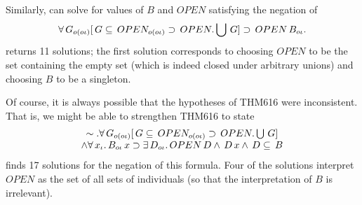 Similarly,  can solve for values of $B$ and $OPEN$
satisfying the negation of 
$$\forall \,G_{o(o\iota)} [ \,G \subseteq \,OPEN_{o(o\iota)} \supset \,OPEN . \bigcup \,G] \supset \,OPEN \,B_{o\iota}.$$
{\TPS} returns 11 solutions; the first solution corresponds to choosing $OPEN$
to be the set containing the empty set (which is indeed closed under arbitrary unions)
and choosing $B$ to be a singleton.

Of course, it is always possible that the hypotheses of {THM616} were inconsistent.
That is, we might be able to strengthen {THM616} to state
$$
\begin{array}{c}
\sim .  \forall \,G_{o(o\iota)} [ \,G \subseteq \,OPEN_{o(o\iota)} \supset \,OPEN . \bigcup \,G] \\
\land \forall \,x_{\iota} . \,B_{o\iota} \,x \supset \exists \,D_{o\iota} . \,OPEN \,D \land \,D \,x \land \,D \subseteq \,B
\end{array}
$$
 finds 17 solutions for the negation of this formula.
Four of the solutions interpret $OPEN$ as the set of all sets of individuals
(so that the interpretation of $B$ is irrelevant).
